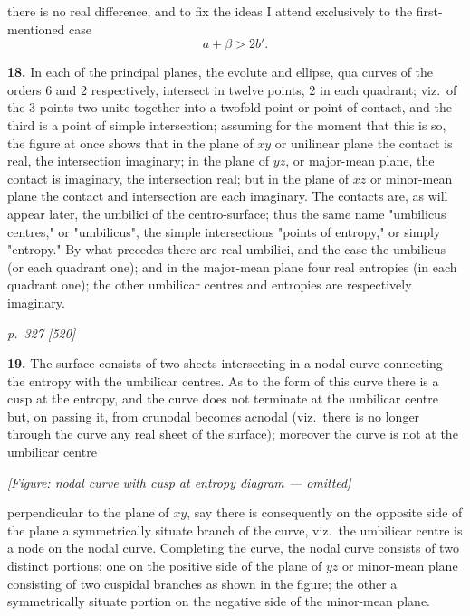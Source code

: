 \documentclass[11pt,a4paper]{book}
\begin{document}
there is no real difference, and to fix the ideas I attend exclusively to the first-mentioned case
\[
a + \beta > 2b'.
\]

\textbf{18.} In each of the principal planes, the evolute and ellipse, qua curves of the orders 6 and 2 respectively, intersect in twelve points, 2 in each quadrant; viz.\ of the 3 points two unite together into a twofold point or point of contact, and the third is a point of simple intersection; assuming for the moment that this is so, the figure at once shows that in the plane of $xy$ or unilinear plane the contact is real, the intersection imaginary; in the plane of $yz$, or major-mean plane, the contact is imaginary, the intersection real; but in the plane of $xz$ or minor-mean plane the contact and intersection are each imaginary. The contacts are, as will appear later, the umbilici of the centro-surface; thus the same name "umbilicus centres," or "umbilicus", the simple intersections "points of entropy," or simply "entropy." By what precedes there are real umbilici, and the case the umbilicus (or each quadrant one); and in the major-mean plane four real entropies (in each quadrant one); the other umbilicar centres and entropies are respectively imaginary.

\clearpage

\bigskip
\textit{p.~327 [520]}
\smallskip

\textbf{19.} The surface consists of two sheets intersecting in a nodal curve connecting the entropy with the umbilicar centres. As to the form of this curve there is a cusp at the entropy, and the curve does not terminate at the umbilicar centre but, on passing it, from crunodal becomes acnodal (viz.\ there is no longer through the curve any real sheet of the surface); moreover the curve is not at the umbilicar centre

\begin{center}
\textit{[Figure: nodal curve with cusp at entropy diagram --- omitted]}
\end{center}

perpendicular to the plane of $xy$, say there is consequently on the opposite side of the plane a symmetrically situate branch of the curve, viz.\ the umbilicar centre is a node on the nodal curve. Completing the curve, the nodal curve consists of two distinct portions; one on the positive side of the plane of $yz$ or minor-mean plane consisting of two cuspidal branches as shown in the figure; the other a symmetrically situate portion on the negative side of the minor-mean plane.
\end{document}
